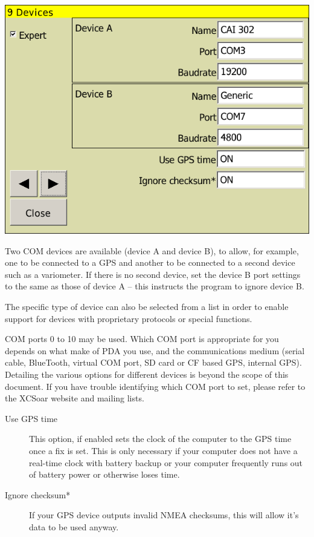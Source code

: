 \documentclass[a4paper,12pt]{refrep}
\begin{document}
\begin{center}
\includegraphics[angle=0,width=0.8\linewidth,keepaspectratio='true']{figures/config-devices.png}
\end{center}

Two COM devices are available (device A and device B), to allow, for
example, one to be connected to a GPS and another to be connected to a
second device such as a variometer.  If there is no second device, set
the device B port settings to the same as those of device A -- this
instructs the program to ignore device B.

The specific type of device can also be selected from a list in order
to enable support for devices with proprietary protocols or special
functions.

COM ports 0 to 10 may be used.  Which COM port is appropriate for you
depends on what make of PDA you use, and the communications medium
(serial cable, BlueTooth, virtual COM port, SD card or CF based GPS,
internal GPS).  Detailing the various options for different devices is
beyond the scope of this document.  If you have trouble identifying
which COM port to set, please refer to the XCSoar website and mailing
lists.

\begin{description}
\item[Use GPS time] This option, if enabled sets the clock of the computer to the GPS time once a fix is set.  
This is only necessary if your computer does not have a real-time clock with battery backup or your computer 
frequently runs out of battery power or otherwise loses time.
\item[Ignore checksum*] If your GPS device outputs invalid NMEA checksums, this will allow it's data to be used anyway.
\end{description}
\end{document}
